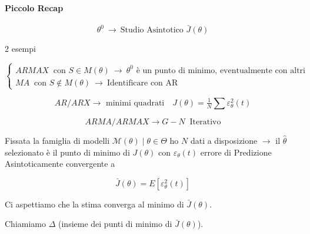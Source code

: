 \documentclass[11pt,a4paper]{article}
\begin{document}
\paragraph{Piccolo Recap}
\[
\theta^0\ \to\ \text{Studio Asintotico }\bar J(\theta)
\]

2 esempi

\[
\begin{cases}
ARMAX\ \text{ con } S\in M(\theta)\ \to\ \theta^0 \text{ è un punto di minimo, eventualmente con altri}\\
MA\ \text{ con } S\notin M(\theta)\ \to\ \text{Identificare con AR}
\end{cases}
\]



\[
AR/ARX \to \text{ minimi quadrati} 
\quad J(\theta) = \tfrac{1}{N}\sum\varepsilon_\theta^2(t)
\]

\[
ARMA/ARMAX \to G\!-\!N\ \text{ Iterativo}
\]

Fissata la famiglia di modelli $\mathcal{M}(\theta)\mid \theta\in\Theta$ ho $N$ dati a disposizione $\rightarrow$  il $\hat\theta$ selezionato è il punto di minimo di $J(\theta)$ con $\varepsilon_\theta(t)$ errore di Predizione Asintoticamente convergente a

\[
\bar J(\theta)=E[\varepsilon_\theta^2(t)]
\]

Ci aspettiamo che la stima converga al minimo di $\bar J(\theta)$.

Chiamiamo $\Delta$ (insieme dei punti di minimo di $\bar J(\theta)$).
\end{document}
